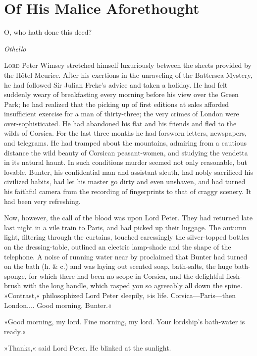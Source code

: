 


\chapter{Of His Malice Aforethought}

\epigraph{O, who hath done this deed?}{\textit{Othello}}


\lettrine[lines=4]{L}{ord} Peter Wimsey stretched himself luxuriously be\-tween the sheets provided by the Hôtel Meurice. After his exertions in the unraveling of the Battersea Mystery, he had followed Sir Julian Freke's advice and taken a holiday. He had felt suddenly weary of breakfasting every morning before his view over the Green Park; he had realized that the picking up of first editions at sales afforded insufficient exercise for a man of thirty-three; the very crimes of London were over-sophisticated. He had abandoned his flat and his friends and fled to the wilds of Corsica. For the last three months he had forsworn letters, newspapers, and telegrams. He had tramped about the mountains, admiring from a cautious distance the wild beauty of Corsican peasant-women, and studying the vendetta in its natural haunt. In such conditions murder seemed not only reasonable, but lovable. Bunter, his confidential man and assistant sleuth, had nobly sacrificed his civilized habits, had let his master go dirty and even unshaven, and had turned his faithful camera from the recording of fingerprints to that of craggy scenery. It had been very refreshing.

Now, however, the call of the blood was upon Lord Peter. They had returned late last night in a vile train to Paris, and had picked up their luggage. The autumn light, filtering through the curtains, touched caressingly the silver-topped bottles on the dressing-table, outlined an electric lamp-shade and the shape of the telephone. A noise of running water near by proclaimed that Bunter had turned on the bath (h. \& c.) and was laying out scented soap, bath-salts, the huge bath-sponge, for which there had been no scope in Corsica, and the delightful flesh-brush with the long handle, which rasped you so agreeably all down the spine. »Contrast,« philosophized Lord Peter sleepily, »is life. Corsica\allowbreak---\allowbreak Paris---then London.... Good morning, Bunter.«

»Good morning, my lord. Fine morning, my lord. Your lordship's bath-water is ready.«

»Thanks,« said Lord Peter. He blinked at the sunlight.

